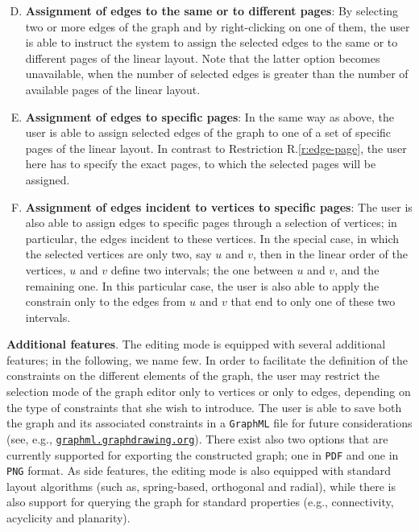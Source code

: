 \documentclass[runningheads]{llncs}
\newcommand{\myparagraph}[1]{\medskip\noindent\textbf{#1}.}
\newcommand\rurl[1]{\href{http://#1}{\nolinkurl{#1}}}
\begin{document}
%
\begin{enumerate}[R.1]
\setcounter{enumi}{3}
\item \label{r:edge-page} \textbf{Assignment of edges to the same or to different pages}: By selecting two or more edges of the graph and by right-clicking on one of them, the user is able to instruct the system to assign the selected edges to the same or to different pages of the linear layout. Note that the latter option becomes unavailable, when the number of selected edges is greater than the number of available pages of the linear layout. 
\item \label{r:same-page} \textbf{Assignment of edges to specific pages}: In the same way as above, the user is able to assign selected edges of the graph to one of a set of specific pages of the linear layout. In contrast to Restriction R.\ref{r:edge-page}, the user here has to specify the exact pages, to which the selected pages will be assigned. 
\item \label{r:incident} \textbf{Assignment of edges incident to vertices to specific pages}: The user is also able to assign edges to specific pages through a selection of vertices; in particular, the edges incident to these vertices. In the special case, in which the selected vertices are only two, say $u$ and $v$, then in the linear order of the vertices, $u$ and $v$ define two intervals; the one between $u$ and $v$, and the remaining one. In this particular case, the user is also able to apply the constrain only to the edges from $u$ and $v$ that end to only one of these two intervals. 
\end{enumerate}
%
\myparagraph{Additional features} The editing mode is equipped with several additional features; in the following, we name few. In order to facilitate the definition of the constraints on the different elements of the graph, the user may restrict the selection mode of the graph editor only to vertices or only to edges, depending on the type of constraints that she wish to introduce. The user is able to save both the graph and its associated constraints in a \texttt{GraphML} file for future considerations (see, e.g., \rurl{graphml.graphdrawing.org}). There exist also two options that are currently supported for exporting the constructed graph; one in \texttt{PDF} and one in \texttt{PNG} format. As side features, the editing mode is also equipped with standard layout algorithms (such as, spring-based, orthogonal and radial), while there is also support for querying the graph for standard properties (e.g., connectivity, acyclicity and planarity). 
\end{document}
